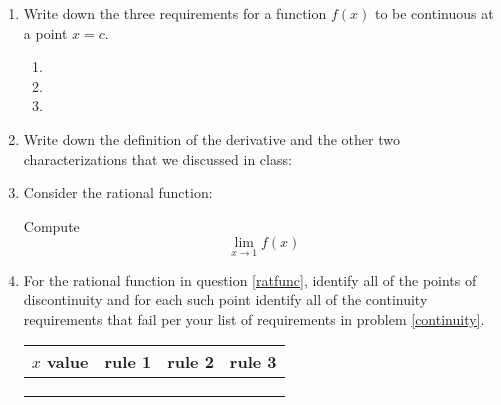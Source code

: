 \documentclass[letterpaper,12pt,fleqn]{article}
\begin{document}
\begin{enumerate}[left=0pt]
\item Write down the three requirements for a function \(f(x)\) to be continuous at a point \(x=c\).
  \label{continuity}
  \begin{enumerate}[label={\arabic*)}]
    \setlength{\parskip}{0.5in}
  \item

  \item

  \item
  \end{enumerate}

  \vspace{0.5in}

\item Write down the definition of the derivative and the other two characterizations that we discussed in class:
  \label{derivative}

  \newpage

\item Consider the rational function:
  \label{ratfunc}
  
  \scalebox{1.5}{
    \[f(x)=\begin{cases}
    \frac{(x^2-4x+3)(x+2)}{(x^2+6x+8)(x-1)}, & x\ne1 \\
    0, & x=1
    \end{cases}\]
  }
  Compute
  \[\lim_{x\to1}f(x)\]

  \vspace{4.5in}

\item For the rational function in question \ref{ratfunc}, identify all of the points of discontinuity and for each
  such point identify all of the continuity requirements that fail per your list of requirements in problem
  \ref{continuity}.

  \bigskip

  \begin{center}
    \begin{tabular}{|p{1in}|p{1in}|p{1in}|p{1in}|}
      \hline
      \(x\) value & rule 1 & rule 2 & rule 3\\
      \hline
      & & & \\[0.25in]
      \hline
      & & & \\[0.25in]
      \hline
      & & & \\[0.25in]
      \hline
    \end{tabular}
  \end{center}


\end{enumerate}
\end{document}

